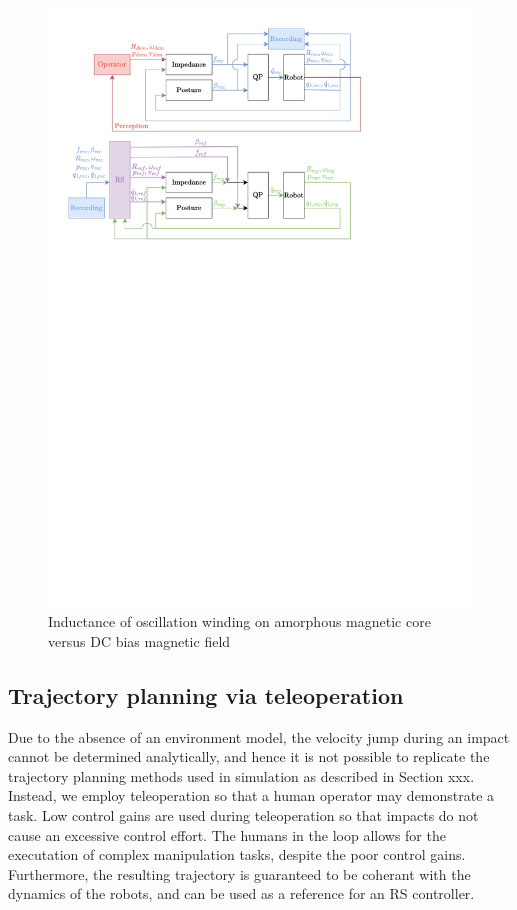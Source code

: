 \documentclass[a4paper, 10pt, conference]{ieeeconf}
\begin{document}
\begin{figure}[h]
    \includegraphics[trim={1cm 17.8cm 5cm 6.5cm}, clip]{Graphics/qp.pdf}
      \caption{Inductance of oscillation winding on amorphous
       magnetic core versus DC bias magnetic field}
      \label{figurelabel}
   \end{figure}

\lipsum[3-10]
    \subsection{Trajectory planning via teleoperation}
    Due to the absence of an environment model, the velocity jump during an impact cannot be determined analytically, and hence it is not possible to replicate the trajectory planning methods used in simulation as described in Section xxx. Instead, we employ teleoperation so that a human operator may demonstrate a task. Low control gains are used during teleoperation so that impacts do not cause an excessive control effort. The humans in the loop allows for the executation of complex manipulation tasks, despite the poor control gains. Furthermore, the resulting trajectory is guaranteed to be coherant with the dynamics of the robots, and can be used as a reference for an RS controller.
\end{document}
